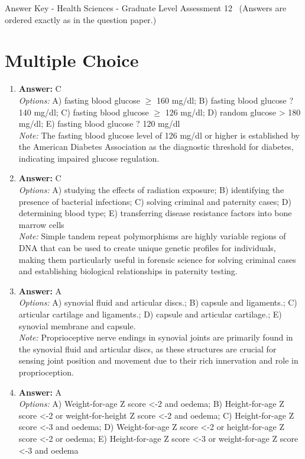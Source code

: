 \documentclass[12pt]{article}
\begin{document}
\begin{center}
Answer Key - Health Sciences - Graduate Level Assessment 12 \
\small (Answers are ordered exactly as in the question paper.)
\end{center}

\section*{Multiple Choice}
\begin{enumerate}[label=\arabic*.]
\item \textbf{Answer:} C
\\ \textit{Options:} A) fasting blood glucose \ensuremath{\geq} 160 mg/dl; B) fasting blood glucose ? 140 mg/dl; C) fasting blood glucose \ensuremath{\geq} 126 mg/dl; D) random glucose \textgreater{} 180 mg/dl; E) fasting blood glucose ? 120 mg/dl
\\ \textit{Note:} The fasting blood glucose level of 126 mg/dl or higher is established by the American Diabetes Association as the diagnostic threshold for diabetes, indicating impaired glucose regulation.
\item \textbf{Answer:} C
\\ \textit{Options:} A) studying the effects of radiation exposure; B) identifying the presence of bacterial infections; C) solving criminal and paternity cases; D) determining blood type; E) transferring disease resistance factors into bone marrow cells
\\ \textit{Note:} Simple tandem repeat polymorphisms are highly variable regions of DNA that can be used to create unique genetic profiles for individuals, making them particularly useful in forensic science for solving criminal cases and establishing biological relationships in paternity testing.
\item \textbf{Answer:} A
\\ \textit{Options:} A) synovial fluid and articular discs.; B) capsule and ligaments.; C) articular cartilage and ligaments.; D) capsule and articular cartilage.; E) synovial membrane and capsule.
\\ \textit{Note:} Proprioceptive nerve endings in synovial joints are primarily found in the synovial fluid and articular discs, as these structures are crucial for sensing joint position and movement due to their rich innervation and role in proprioception.
\item \textbf{Answer:} A
\\ \textit{Options:} A) Weight-for-age Z score \textless{}-2 and oedema; B) Height-for-age Z score \textless{}-2 or weight-for-height Z score \textless{}-2 and oedema; C) Height-for-age Z score \textless{}-3 and oedema; D) Weight-for-age Z score \textless{}-2 or height-for-age Z score \textless{}-2 or oedema; E) Height-for-age Z score \textless{}-3 or weight-for-age Z score \textless{}-3 and oedema

\end{enumerate}
\end{document}
